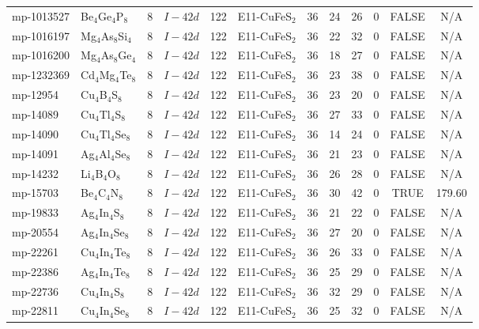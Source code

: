 {\begin{longtable}{llcccccccccc}
    mp-1013527 & Be$_{4}$Ge$_{4}$P$_{8}$ & 8     & $I-42d$ & 122   & E11-CuFeS$_{2}$ & 36    & 24    & 26    & 0     & FALSE & N/A \\
    mp-1016197 & Mg$_{4}$As$_{8}$Si$_{4}$ & 8     & $I-42d$ & 122   & E11-CuFeS$_{2}$ & 36    & 22    & 32    & 0     & FALSE & N/A \\
    mp-1016200 & Mg$_{4}$As$_{8}$Ge$_{4}$ & 8     & $I-42d$ & 122   & E11-CuFeS$_{2}$ & 36    & 18    & 27    & 0     & FALSE & N/A \\
    mp-1232369 & Cd$_{4}$Mg$_{4}$Te$_{8}$ & 8     & $I-42d$ & 122   & E11-CuFeS$_{2}$ & 36    & 23    & 38    & 0     & FALSE & N/A \\
    mp-12954 & Cu$_{4}$B$_{4}$S$_{8}$ & 8     & $I-42d$ & 122   & E11-CuFeS$_{2}$ & 36    & 23    & 20    & 0     & FALSE & N/A \\
    mp-14089 & Cu$_{4}$Tl$_{4}$S$_{8}$ & 8     & $I-42d$ & 122   & E11-CuFeS$_{2}$ & 36    & 27    & 33    & 0     & FALSE & N/A \\
    mp-14090 & Cu$_{4}$Tl$_{4}$Se$_{8}$ & 8     & $I-42d$ & 122   & E11-CuFeS$_{2}$ & 36    & 14    & 24    & 0     & FALSE & N/A \\
    mp-14091 & Ag$_{4}$Al$_{4}$Se$_{8}$ & 8     & $I-42d$ & 122   & E11-CuFeS$_{2}$ & 36    & 21    & 23    & 0     & FALSE & N/A \\
    mp-14232 & Li$_{4}$B$_{4}$O$_{8}$ & 8     & $I-42d$ & 122   & E11-CuFeS$_{2}$ & 36    & 26    & 28    & 0     & FALSE & N/A \\
    mp-15703 & Be$_{4}$C$_{4}$N$_{8}$ & 8     & $I-42d$ & 122   & E11-CuFeS$_{2}$ & 36    & 30    & 42    & 0     & TRUE  & 179.60  \\
    mp-19833 & Ag$_{4}$In$_{4}$S$_{8}$ & 8     & $I-42d$ & 122   & E11-CuFeS$_{2}$ & 36    & 21    & 22    & 0     & FALSE & N/A \\
    mp-20554 & Ag$_{4}$In$_{4}$Se$_{8}$ & 8     & $I-42d$ & 122   & E11-CuFeS$_{2}$ & 36    & 27    & 20    & 0     & FALSE & N/A \\
    mp-22261 & Cu$_{4}$In$_{4}$Te$_{8}$ & 8     & $I-42d$ & 122   & E11-CuFeS$_{2}$ & 36    & 26    & 33    & 0     & FALSE & N/A \\
    mp-22386 & Ag$_{4}$In$_{4}$Te$_{8}$ & 8     & $I-42d$ & 122   & E11-CuFeS$_{2}$ & 36    & 25    & 29    & 0     & FALSE & N/A \\
    mp-22736 & Cu$_{4}$In$_{4}$S$_{8}$ & 8     & $I-42d$ & 122   & E11-CuFeS$_{2}$ & 36    & 32    & 29    & 0     & FALSE & N/A \\
    mp-22811 & Cu$_{4}$In$_{4}$Se$_{8}$ & 8     & $I-42d$ & 122   & E11-CuFeS$_{2}$ & 36    & 25    & 32    & 0     & FALSE & N/A \\

\end{longtable}}
